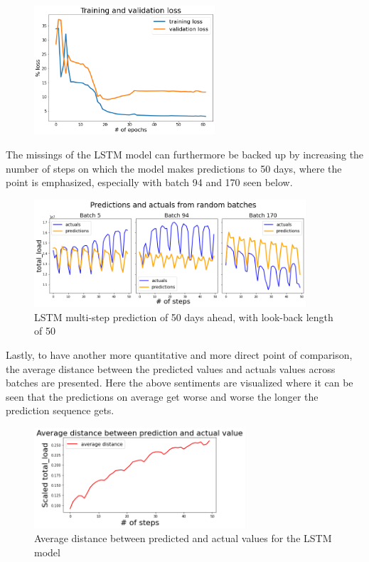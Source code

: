 \documentclass[main.tex]{subfiles}
\begin{document}
\begin{figure}[H]
\centering
\includegraphics[width=0.6\textwidth]{RNNPlots/lstmloss25day.png}
\caption{}
\label{fig:lstm_loss_1}
\end{figure}

The missings of the LSTM model can furthermore be backed up by increasing the number of steps on which the model makes predictions to 50 days, where the point is emphasized, especially with batch 94 and 170 seen below.

\begin{figure}[H]
\centering
\includegraphics[width=0.9\textwidth]{RNNPlots/lstmpredictionsbad2.png}
\caption{LSTM multi-step prediction of 50 days ahead, with look-back length of 50}
\label{fig:lstm_preds_2}
\end{figure}

Lastly, to have another more quantitative and more direct point of comparison, the average distance between the predicted values and actuals values across batches are presented. Here the above sentiments are visualized where it can be seen that the predictions on average get worse and worse the longer the prediction sequence gets.

\begin{figure}[H]
    \centering
    \includegraphics[width=0.7\textwidth]{RNNPlots/avgerrorlstm.png}
    \caption{Average distance between predicted and actual values for the LSTM model}
    \label{fig:avgerrorlstm}
\end{figure}
\end{document}
